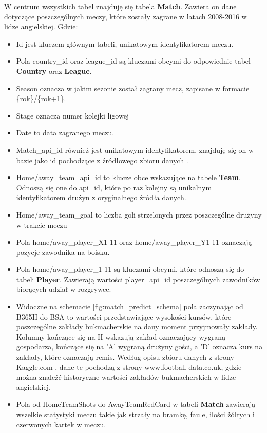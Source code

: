 W centrum wszystkich tabel znajduję się tabela \textbf{Match}. Zawiera on dane dotyczące poszczególnych meczy, które zostały zagrane w latach 2008-2016 w lidze angielskiej. Gdzie: 
\begin{itemize}
    \item Id jest kluczem głównym tabeli, unikatowym identyfikatorem meczu.
    
    \item Pola country\_id oraz league\_id są kluczami obcymi do odpowiednie tabel \textbf{Country} oraz \textbf{League}.
    
    \item Season oznacza w jakim sezonie został zagrany mecz, zapisane w formacie \{rok\}/\{rok+1\}.
    
    \item Stage oznacza numer kolejki ligowej
    
    \item Date to data zagranego meczu.
    
    \item Match\_api\_id również jest unikatowym identyfikatorem, znajduję się on w bazie jako id pochodzące z źródłowego zbioru danych         \cite{football_data_enetscore}.
    
    \item Home/away\_team\_api\_id to klucze obce wskazujące na tabele \textbf{Team}. Odnoszą się one do api\_id, które po raz kolejny są       unikalnym identyfikatorem drużyn z oryginalnego źródła danych.
    
    \item Home/away\_team\_goal to liczba goli strzelonych przez poszczególne drużyny w trakcie meczu
    
    \item Pola home/away\_player\_X1-11 oraz home/away\_player\_Y1-11 oznaczają pozycje zawodnika na boisku.
    
    \item Pola home/away\_player\_1-11 są kluczami obcymi, które odnoszą się do tabeli \textbf{Player}. Zawierają wartości player\_api\_id poszczególnych zawodników biorących udział w rozgrywce.
    
    \item Widoczne na schemacie \ref{fig:match_predict_schema} pola zaczynając od B365H do BSA to wartości przedstawiające wysokości kursów, które poszczególne zakłady bukmacherskie na dany moment przyjmowały zakłady. Kolumny kończące się na H wskazują zakład oznaczający wygraną gospodarza, kończące się na 'A' wygraną drużyny gości, a 'D' oznacza kurs na zakłady, które oznaczają remis. Według opisu zbioru danych z strony Kaggle.com \cite{kagggle_european_soccer_database}, dane te pochodzą z strony www.football-data.co.uk, gdzie można znaleźć historyczne wartości zakładów bukmacherskich w lidze angielskiej.
    
    \item Pola od HomeTeamShots do AwayTeamRedCard w tabeli \textbf{Match} zawierają wszelkie statystyki meczu takie jak strzały na bramkę, faule, ilości żółtych i czerwonych kartek w meczu.
\end{itemize}


